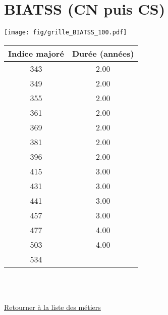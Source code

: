 \chapter{BIATSS (CN puis CS)} 

\begin{minipage}{0.55\linewidth}\texttt{[image: fig/grille\_BIATSS\_100.pdf]}\end{minipage} 
\begin{minipage}{0.3\linewidth} 
 \begin{center} 

\begin{tabular}[htb]{|c|c|} 
\hline 
 Indice majoré &  Durée (années) \\ 
\hline \hline 
 343 &  2.00 \\ 
\hline 
 349 &  2.00 \\ 
\hline 
 355 &  2.00 \\ 
\hline 
 361 &  2.00 \\ 
\hline 
 369 &  2.00 \\ 
\hline 
 381 &  2.00 \\ 
\hline 
 396 &  2.00 \\ 
\hline 
 415 &  3.00 \\ 
\hline 
 431 &  3.00 \\ 
\hline 
 441 &  3.00 \\ 
\hline 
 457 &  3.00 \\ 
\hline 
 477 &  4.00 \\ 
\hline 
 503 &  4.00 \\ 
\hline 
 534 &   \\ 
\hline 
\hline 
\end{tabular} 
\end{center} 
 \end{minipage} 

~\\ 
 


   
 \localtableofcontents 

~\\ 
 
 \hyperlink{page.2}{\noindent Retourner à la liste des métiers}

